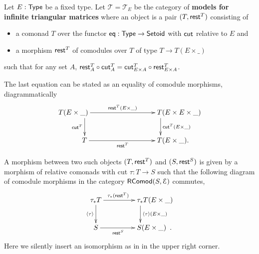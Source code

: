 \documentclass[a4paper,USenglish]{lipics}
\newcommand{\fat}[1]{\textbf{#1}}
\begin{document}
\begin{defn}
\label{def:cat_tri}
   Let $E:\mathsf{Type}$ be a fixed type.
   Let $\mathcal{T} = \mathcal{T}_E$ be the category of \fat{models for infinite triangular matrices} where an object is a pair $(T,\mathsf{rest}^T)$ consisting of
   \begin{itemize}
    \item a comonad $T$ over the functor $\mathsf{eq}:\mathsf{Type}\to\mathsf{Setoid}$ with $\mathsf{cut}$ relative to $E$ and
    \item a morphism $\mathsf{rest}^T$ of comodules over $T$ of type $T \to T(E\times \_)$
   \end{itemize}
   such that for any set $A$,
    $ {\mathsf{rest}^T_A} \circ {\ensuremath{\mathsf{cut}}^T_A} = {\mathsf{cut}^T_{E\times A}} \circ {\ensuremath{\mathsf{rest}}^T_{E\times A}}$.
    
   The last equation can be stated as an equality of comodule morphisms, diagrammatically
   \[
    \begin{xy}
     \xymatrix@C=5em{
                    **[l]  T(E\times \_) \ar[d]_{\cut^T} \ar[r]^-{\tail^T(E\times \_ )} & **[r] T(E \times E \times \_)  \ar[d]^{\cut^T(E\times\_)} \\
                     **[l] T \ar[r]_{\tail^T} & **[r] T (E\times \_).
     }
    \end{xy}
   \]

  
   \noindent
   A morphism between two such objects $(T,\mathsf{rest}^T)$ and $(S,\mathsf{rest}^S)$
   is given by a morphism of relative comonads with cut $\tau : T \to S$ such that
   the following diagram of comodule morphisms in the category $\mathsf{RComod}(S,\mathcal{E})$ commutes,
   \begin{equation} \begin{xy}
       \xymatrix{   \tau_*T  \ar[r]^{\tau_*(\tail^T)} \ar[d]_{\induced{\tau}}  &  **[r] \tau_*T (E\times \_ )\ar[d]^{\induced{\tau}(E\times \_)} \\
                    S  \ar[r]_{\tail^S}  &  **[r] S (E\times \_ ) \enspace .
        }
      \end{xy}
      \label{eq:tri_model}
   \end{equation}
   Here we silently insert an isomorphism as in  in the upper right corner.
\end{defn}   
\end{document}
